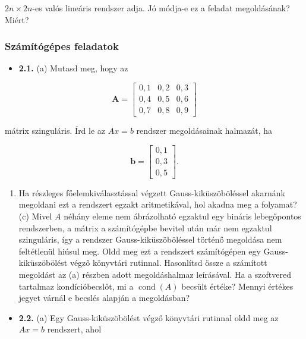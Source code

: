 \documentclass[
  magyar,
  11pt]{article}
\providecommand{\tightlist}{%
  \setlength{\itemsep}{0pt}\setlength{\parskip}{0pt}}
\providecommand{\boldsymbol}[1]{\mathbf{#1}}
\begin{document}
\(2n \times 2n\)-es valós lineáris rendszer adja. Jó módja-e ez a
feladat megoldásának? Miért?

\subsubsection{Számítógépes
feladatok}\label{szuxe1muxedtuxf3guxe9pes-feladatok-1}

\begin{itemize}
\tightlist
\item
  \textbf{2.1.} (a) Mutasd meg, hogy az
\end{itemize}

\[\mathbf{A} = \begin{bmatrix} 0{,}1 & 0{,}2 & 0{,}3 \\ 0{,}4 & 0{,}5 & 0{,}6 \\ 0{,}7 & 0{,}8 & 0{,}9 \end{bmatrix}\]

mátrix szinguláris. Írd le az \(Ax = b\) rendszer megoldásainak
halmazát, ha

\[\boldsymbol{b} = \begin{bmatrix} 0{,}1 \\ 0{,}3 \\ 0{,}5 \end{bmatrix}.\]

\begin{enumerate}
\def\labelenumi{(\alph{enumi})}
\setcounter{enumi}{1}
\tightlist
\item
  Ha részleges főelemkiválasztással végzett Gauss-kiküszöböléssel
  akarnánk megoldani ezt a rendszert egzakt aritmetikával, hol akadna
  meg a folyamat? (c) Mivel \(A\) néhány eleme nem ábrázolható egzaktul
  egy bináris lebegőpontos rendszerben, a mátrix a számítógépbe bevitel
  után már nem egzaktul szinguláris, így a rendszer
  Gauss-kiküszöböléssel történő megoldása nem feltétlenül hiúsul meg.
  Oldd meg ezt a rendszert számítógépen egy Gauss-kiküszöbölést végző
  könyvtári rutinnal. Hasonlítsd össze a számított megoldást az (a)
  részben adott megoldáshalmaz leírásával. Ha a szoftvered tartalmaz
  kondícióbecslőt, mi a \(\operatorname{cond}(A)\) becsült értéke?
  Mennyi értékes jegyet várnál e becslés alapján a megoldásban?
\end{enumerate}

\begin{itemize}
\tightlist
\item
  \textbf{2.2.} (a) Egy Gauss-kiküszöbölést végző könyvtári rutinnal
  oldd meg az \(Ax = b\) rendszert, ahol
\end{itemize}
\end{document}
